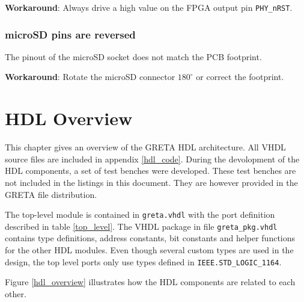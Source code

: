 \documentclass[a4paper]{report}
\begin{document}
\textbf{Workaround}: Always drive a high value on the FPGA output
pin \texttt{PHY\_nRST}.

\subsection{microSD pins are reversed}
The pinout of the microSD socket does not match the PCB footprint.

\textbf{Workaround}: Rotate the microSD connector $180^\circ$ or
correct the footprint.

\chapter{HDL Overview}
This chapter gives an overview of the GRETA HDL architecture.
All VHDL source files are included in appendix \ref{hdl_code}.
During the devolopment of the HDL components, a set of test
benches were developed. These test benches are not included
in the listings in this document. They are however provided
in the GRETA file distribution.

The top-level module is contained in \texttt{greta.vhdl}
with the port definition described in table \ref{top_level}.
The VHDL package in file \texttt{greta\_pkg.vhdl} contains
type definitions, address constants, bit constants and helper
functions for the other HDL modules. Even though several custom
types are used in the design, the top level ports only use
types defined in \texttt{IEEE.STD\_LOGIC\_1164}.

Figure \ref{hdl_overview} illustrates how the HDL
components are related to each other.
\end{document}
